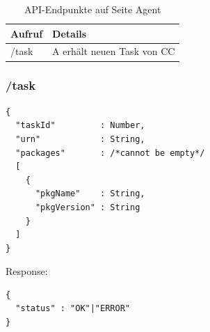 \begin{table}[H]
    \centering
    \caption{API-Endpunkte auf Seite Agent}
    \label{api:endpoints_a}
    \begin{tabular}{ll}
        \hline
        \textbf{Aufruf}  & \textbf{Details}            \\ \hline
        /task            & A erhält neuen Task von CC  \\ \hline
    \end{tabular}
\end{table}

\subsubsection{/task}

\begin{verbatim}
{
  "taskId"         : Number,
  "urn"            : String,
  "packages"       : /*cannot be empty*/
  [
    {
      "pkgName"    : String,
      "pkgVersion" : String
    }
  ]
}
\end{verbatim}

Response: 

\begin{verbatim}
{
  "status" : "OK"|"ERROR" 
}
\end{verbatim}